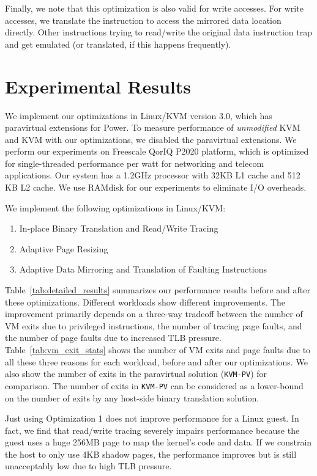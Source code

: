 \documentclass[10pt,twocolumn]{article}
\begin{document}
Finally, we note that this optimization is also valid for write accesses. For write
accesses, we translate the instruction to access the mirrored data location
directly. Other instructions trying to read/write the original data instruction
trap and get emulated (or translated, if this happens frequently).
\section{Experimental Results}
\label{sec:results}
We implement our optimizations in Linux/KVM version 3.0, which
has paravirtual extensions for Power. To measure performance of
{\em unmodified} KVM and KVM with our optimizations,
we disabled the paravirtual extensions. We perform our experiments
on Freescale QorIQ P2020 platform, which is optimized for single-threaded
performance per watt for networking and telecom applications. Our
system has a 1.2GHz processor with 32KB L1 cache and 512 KB L2 cache.
We use RAMdisk for our experiments to eliminate I/O
overheads.

We implement the following optimizations in Linux/KVM:
\begin{enumerate}
  \item In-place Binary Translation and Read/Write Tracing
  \item Adaptive Page Resizing
  \item Adaptive Data Mirroring and Translation of Faulting Instructions
\end{enumerate}
Table~\ref{tab:detailed_results} summarizes our performance results before and
after these optimizations.
Different workloads show different improvements. The improvement primarily depends
on a three-way tradeoff between the number of VM exits due to privileged
instructions, the number of
tracing page faults, and the number of page faults due to increased TLB pressure.
Table~\ref{tab:vm_exit_stats} shows the number of VM exits and page faults due
to all these three reasons for each workload, before and after our optimizations.
We also show the number of exits in the paravirtual solution ({\tt KVM-PV}) for
comparison. The number of exits in {\tt KVM-PV} can be considered as a
lower-bound on the number of exits by any host-side binary translation solution.

Just using Optimization 1 does not improve performance for a Linux guest.
In fact, we find that read/write tracing severely impairs performance because
the guest uses a huge 256MB page to map the kernel's code and data. If we
constrain the host to only use 4KB shadow pages, the performance improves
but is still unacceptably low due to high TLB pressure.
\end{document}

